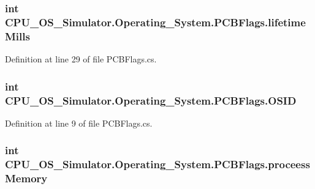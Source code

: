 \subsubsection[{lifetime\+Mills}]{\setlength{\rightskip}{0pt plus 5cm}int C\+P\+U\+\_\+\+O\+S\+\_\+\+Simulator.\+Operating\+\_\+\+System.\+P\+C\+B\+Flags.\+lifetime\+Mills}\label{struct_c_p_u___o_s___simulator_1_1_operating___system_1_1_p_c_b_flags_a8079f3c5421cf89d5019718f857b4c7e}


Definition at line 29 of file P\+C\+B\+Flags.\+cs.

\hypertarget{struct_c_p_u___o_s___simulator_1_1_operating___system_1_1_p_c_b_flags_ac8d5b519b8ac16523a5ec55ab8817f46}{}
\subsubsection[{O\+S\+I\+D}]{\setlength{\rightskip}{0pt plus 5cm}int C\+P\+U\+\_\+\+O\+S\+\_\+\+Simulator.\+Operating\+\_\+\+System.\+P\+C\+B\+Flags.\+O\+S\+I\+D}\label{struct_c_p_u___o_s___simulator_1_1_operating___system_1_1_p_c_b_flags_ac8d5b519b8ac16523a5ec55ab8817f46}


Definition at line 9 of file P\+C\+B\+Flags.\+cs.

\hypertarget{struct_c_p_u___o_s___simulator_1_1_operating___system_1_1_p_c_b_flags_a4248a993bf5be874fcd2843269bb9058}{}
\subsubsection[{proceess\+Memory}]{\setlength{\rightskip}{0pt plus 5cm}int C\+P\+U\+\_\+\+O\+S\+\_\+\+Simulator.\+Operating\+\_\+\+System.\+P\+C\+B\+Flags.\+proceess\+Memory}\label{struct_c_p_u___o_s___simulator_1_1_operating___system_1_1_p_c_b_flags_a4248a993bf5be874fcd2843269bb9058}


